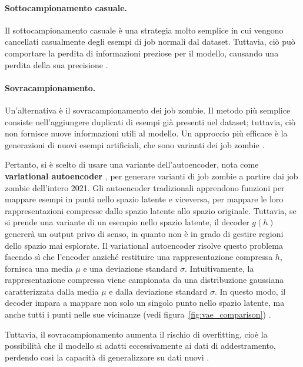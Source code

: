 \paragraph{Sottocampionamento casuale.} Il sottocampionamento casuale è una
strategia molto semplice in cui vengono cancellati casualmente degli esempi di
job normali dal dataset. Tuttavia, ciò può comportare la perdita di
informazioni preziose per il modello, causando una perdita della sua
precisione \cite{he2013}.

\paragraph{Sovracampionamento.}
\label{par:vae}

Un'alternativa è il sovracampionamento dei job zombie. Il metodo più semplice
consiste nell'aggiungere duplicati di esempi già presenti nel dataset;
tuttavia, ciò non fornisce nuove informazioni utili al modello. Un approccio
più efficace è la generazioni di nuovi esempi artificiali, che sono varianti
dei job zombie \cite{brownlee2021}. 

Pertanto, si è scelto di usare una variante dell'autoencoder, nota come
\textbf{variational autoencoder} \cite{kingma2022}, per generare varianti di
job zombie a partire dai job zombie dell'intero 2021. Gli autoencoder
tradizionali apprendono funzioni per mappare esempi in punti nello spazio
latente e viceversa, per mappare le loro rappresentazioni compresse dallo
spazio latente allo spazio originale. Tuttavia, se si prende una variante di
un esempio nello spazio latente, il decoder $g(h)$ genererà un output privo di
senso, in quanto non è in grado di gestire regioni dello spazio mai esplorate.
Il variational autoencoder risolve questo problema facendo sì che l'encoder
anziché restituire una rappresentazione compressa $h$, fornisca una media
$\mu$ e una deviazione standard $\sigma$. Intuitivamente, la rappresentazione
compressa viene campionata da una distribuzione gaussiana caratterizzata dalla
media $\mu$ e dalla deviazione standard $\sigma$. In questo modo, il decoder
impara a mappare non solo un singolo punto nello spazio latente, ma anche
tutti i punti nelle sue vicinanze (vedi figura~\ref{fig:vae_comparison})
\cite{shafkat2018}.

Tuttavia, il sovracampionamento aumenta il rischio di overfitting, cioè la
possibilità che il modello si adatti eccessivamente ai dati di addestramento,
perdendo così la capacità di generalizzare su dati nuovi \cite{fernandez2018}.

